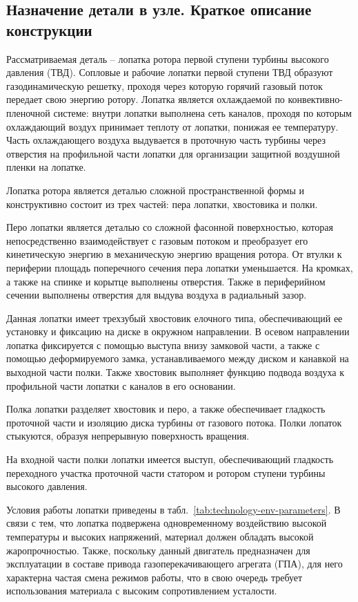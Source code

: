 \subsection{Назначение детали в узле. Краткое описание конструкции}
Рассматриваемая деталь – лопатка ротора первой ступени турбины высокого давления (ТВД). Сопловые и рабочие лопатки первой
ступени ТВД образуют газодинамическую решетку, проходя через которую горячий газовый поток передает свою энергию ротору.
Лопатка является охлаждаемой по конвективно-пленочной системе: внутри лопатки выполнена сеть каналов, проходя по которым
охлаждающий воздух принимает теплоту от лопатки, понижая ее температуру. Часть охлаждающего воздуха выдувается в проточную
часть турбины через отверстия на профильной части лопатки для организации защитной воздушной пленки на лопатке.

Лопатка ротора является деталью сложной пространственной формы и конструктивно состоит из трех частей: пера лопатки, хвостовика и полки.

Перо лопатки является деталью со сложной фасонной поверхностью, которая непосредственно взаимодействует с газовым потоком
и преобразует его кинетическую энергию в механическую энергию вращения ротора. От втулки к периферии площадь поперечного
сечения пера лопатки уменьшается. На кромках, а также на спинке и корытце выполнены отверстия. Также в периферийном сечении
выполнены отверстия для выдува воздуха в радиальный зазор.

Данная лопатки имеет трехзубый хвостовик елочного типа, обеспечивающий ее установку и фиксацию на диске в окружном направлении.
В осевом направлении лопатка фиксируется с помощью выступа внизу замковой части, а также с помощью деформируемого замка,
устанавливаемого между диском и канавкой на выходной части полки. Также хвостовик выполняет функцию подвода воздуха к
профильной части лопатки с каналов в его основании.

Полка лопатки разделяет хвостовик и перо, а также обеспечивает гладкость проточной части и изоляцию диска турбины от газового
потока. Полки лопаток стыкуются, образуя непрерывную поверхность вращения.

На входной части полки лопатки имеется выступ, обеспечивающий гладкость переходного участка проточной части статором и
ротором ступени турбины высокого давления.

Условия работы лопатки приведены в табл.~\ref{tab:technology-env-parameters}.
В связи с тем, что лопатка подвержена одновременному воздействию высокой температуры и высоких напряжений, материал должен обладать высокой жаропрочностью. Также, поскольку данный двигатель предназначен для эксплуатации в составе привода газоперекачивающего агрегата (ГПА), для него характерна частая смена режимов работы, что в свою очередь требует использования материала с высоким сопротивлением усталости.

